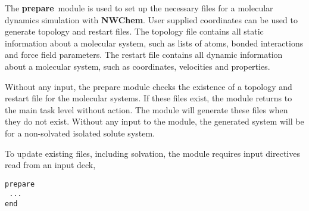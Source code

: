 %
%
\label{sec:prepare}
\def\bmu{\mbox{\boldmath $\mu$}}
\def\bE{\mbox{\bf E}}
\def\br{\mbox{\bf r}}
\def\tT{\tilde{T}}
\def\t{\tilde{1}}
\def\ip{i\prime}
\def\jp{j\prime}
\def\ipp{i\prime\prime}
\def\jpp{j\prime\prime}
\def\etal{{\sl et al.}}
\def\nwchem{{\bf NWChem}}
\def\nwargos{{\bf nwargos}}
\def\nwtop{{\bf nwtop}}
\def\nwrst{{\bf nwrst}}
\def\nwsgm{{\bf nwsgm}}
\def\esp{{\bf esp}}
\def\md{{\bf md}}
\def\prepare{{\bf prepare}}
\def\argos{{\bf ARGOS}}
\def\amber{{\bf AMBER}}
\def\charmm{{\bf CHARMM}}

The \prepare\ module is used to set up the necessary files for a molecular
dynamics simulation with \nwchem. User supplied coordinates can be used to
generate topology and restart files. The topology file contains all static
information about a molecular system, such as lists of atoms, bonded
interactions and force field parameters. The restart file contains all
dynamic information about a molecular system, such as coordinates, velocities
and properties.

Without any input, the prepare module checks the existence of a topology
and restart file for the molecular systems. If these files exist, the module
returns to the main task level without action. The module will generate these 
files when they do not exist. Without any input to the module, the generated 
system will be for a non-solvated isolated solute system.

To update existing files, including solvation, the module requires input
directives read from an input deck,

\begin{verbatim}
prepare
 ...
end
\end{verbatim}


